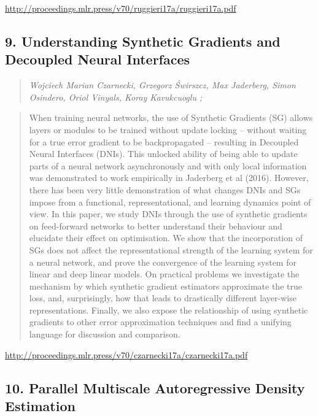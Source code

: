 \documentclass{article}
\begin{document}
\href{http://proceedings.mlr.press/v70/ruggieri17a/ruggieri17a.pdf}{http://proceedings.mlr.press/v70/ruggieri17a/ruggieri17a.pdf}

\subsection{9. Understanding Synthetic Gradients and Decoupled Neural Interfaces}

\begin{quote}
\footnotesize{\textit{Wojciech Marian Czarnecki, Grzegorz Świrszcz, Max Jaderberg, Simon Osindero, Oriol Vinyals, Koray Kavukcuoglu ;}}
\end{quote}

\begin{quote}
    When training neural networks, the use of Synthetic Gradients (SG) allows layers or modules to be trained without update locking – without waiting for a true error gradient to be backpropagated – resulting in Decoupled Neural Interfaces (DNIs). This unlocked ability of being able to update parts of a neural network asynchronously and with only local information was demonstrated to work empirically in Jaderberg et al (2016). However, there has been very little demonstration of what changes DNIs and SGs impose from a functional, representational, and learning dynamics point of view. In this paper, we study DNIs through the use of synthetic gradients on feed-forward networks to better understand their behaviour and elucidate their effect on optimisation. We show that the incorporation of SGs does not affect the representational strength of the learning system for a neural network, and prove the convergence of the learning system for linear and deep linear models. On practical problems we investigate the mechanism by which synthetic gradient estimators approximate the true loss, and, surprisingly, how that leads to drastically different layer-wise representations. Finally, we also expose the relationship of using synthetic gradients to other error approximation techniques and find a unifying language for discussion and comparison.  \end{quote}

\href{http://proceedings.mlr.press/v70/czarnecki17a/czarnecki17a.pdf}{http://proceedings.mlr.press/v70/czarnecki17a/czarnecki17a.pdf}

\subsection{10. Parallel Multiscale Autoregressive Density Estimation}
\end{document}
